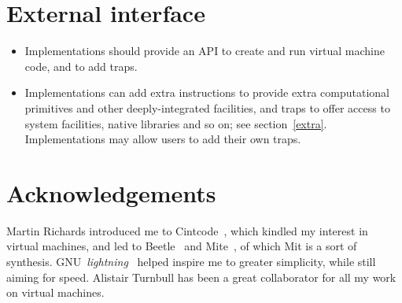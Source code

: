 \documentclass[a4paper]{article}
\begin{document}
\section{External interface}

\begin{itemize}
\item Implementations should provide an API to create and run virtual machine code, and to add traps.
\item Implementations can add extra instructions to provide extra computational primitives and other deeply-integrated facilities, and traps to offer access to system facilities, native libraries and so on; see section~\ref{extra}. Implementations may allow users to add their own traps.
\end{itemize}


\section*{Acknowledgements}

Martin Richards introduced me to Cintcode~\cite{cintweb}, which
kindled my interest in virtual machines, and led to
Beetle~\cite{beetledis} and Mite~\cite{mite0},
of which Mit is a sort of synthesis.
GNU~\emph{lightning}~\cite{lightning} helped inspire me to greater
simplicity, while still aiming for speed. Alistair Turnbull
has been a great collaborator for all my work on virtual machines.



\end{document}
